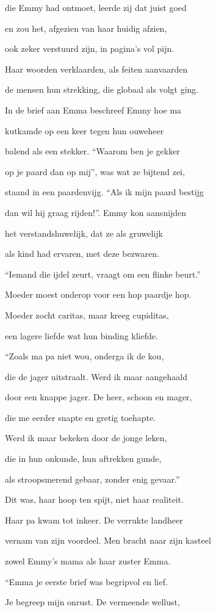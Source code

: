 die Emmy had ontmoet,
leerde zij dat juist goed

en zou het, afgezien
van haar huidig afzien,

ook zeker verstuurd zijn,
in pagina’s vol pijn.

Haar woorden verklaarden,
als feiten aanvaarden

de mensen hun strekking,
die globaal als volgt ging.

In de brief aan Emma
beschreef Emmy hoe ma

kutkamde op een keer
tegen hun ouweheer

balend als een stekker.
“Waarom ben je gekker

op je paard dan op mij”,
was wat ze bijtend zei,

staand in een paardenvijg.
“Als ik mijn paard bestijg

dan wil hij graag rijden!”.
Emmy kon aansnijden

het verstandshuwelijk,
dat ze als gruwelijk

als kind had ervaren,
met deze bezwaren.

“Iemand die ijdel zeurt,
vraagt om een flinke beurt.”

Moeder moest onderop
voor een hop paardje hop.

Moeder zocht caritas,
maar kreeg cupiditas,

een lagere liefde
wat hun binding kliefde.

“Zoals ma pa niet wou,
onderga ik de kou,

die de jager uitstraalt.
Werd ik maar aangehaald

door een knappe jager.
De heer, schoon en mager,

die me eerder snapte
en gretig toehapte.

Werd ik maar bekeken
door de jonge leken,

die in hun onkunde,
hun aftrekken gunde,

als stroopsmerend gebaar,
zonder enig gevaar.”

Dit was, haar hoop ten spijt,
niet haar realiteit.

Haar pa kwam tot inkeer.
De verrukte landheer

vernam van zijn voordeel.
Men bracht naar zijn kasteel

zowel Emmy’s mama
als haar zuster Emma.

“Emma je eerste brief
was begripvol en lief.

Je begreep mijn onrust.
De vermeende wellust,

